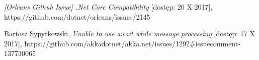\begin{thebibliography}{10}
 \emph{[Orleans Github Issue] .Net Core Compatibility} [dostęp: 20 X 2017],
https://github.com/dotnet/orleans/issues/2145

 Bartosz Sypytkowski, \emph{Unable to use await while message processing} [dostęp: 17 X 2017], 
https://github.com/akkadotnet/akka.net/issues/1292\#issuecomment-137730065


\end{thebibliography}